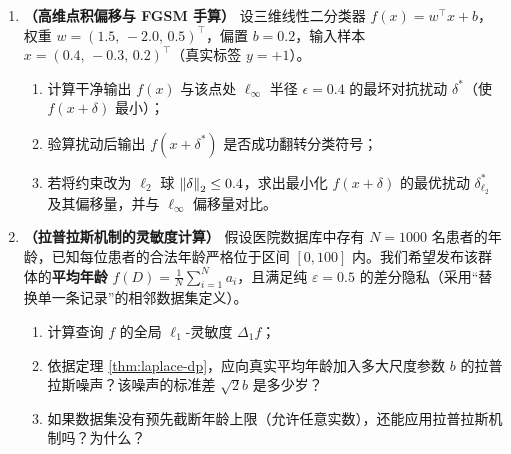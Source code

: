 \begin{enumerate}[label=\textbf{7.3.\arabic*}]
  \item \textbf{（高维点积偏移与 FGSM 手算）} 设三维线性二分类器 $f(x) = w^\top x + b$，权重 $w = (1.5,\, -2.0,\, 0.5)^\top$，偏置 $b = 0.2$，输入样本 $x = (0.4,\, -0.3,\, 0.2)^\top$（真实标签 $y = +1$）。
  \begin{enumerate}
    \item 计算干净输出 $f(x)$ 与该点处 $\ell_\infty$ 半径 $\epsilon = 0.4$ 的最坏对抗扰动 $\delta^*$（使 $f(x+\delta)$ 最小）；
    \item 验算扰动后输出 $f(x+\delta^*)$ 是否成功翻转分类符号；
    \item 若将约束改为 $\ell_2$ 球 $\left\|\delta\right\|_2 \le 0.4$，求出最小化 $f(x+\delta)$ 的最优扰动 $\delta_{\ell_2}^*$ 及其偏移量，并与 $\ell_\infty$ 偏移量对比。
  \end{enumerate}

  \item \textbf{（拉普拉斯机制的灵敏度计算）} 假设医院数据库中存有 $N = 1000$ 名患者的年龄，已知每位患者的合法年龄严格位于区间 $[0, 100]$ 内。我们希望发布该群体的\textbf{平均年龄} $f(D) = \frac{1}{N}\sum_{i=1}^N a_i$，且满足纯 $\varepsilon = 0.5$ 的差分隐私（采用“替换单一条记录”的相邻数据集定义）。
  \begin{enumerate}
    \item 计算查询 $f$ 的全局 $\ell_1$-灵敏度 $\Delta_1 f$；
    \item 依据定理 \ref{thm:laplace-dp}，应向真实平均年龄加入多大尺度参数 $b$ 的拉普拉斯噪声？该噪声的标准差 $\sqrt{2}b$ 是多少岁？
    \item 如果数据集没有预先截断年龄上限（允许任意实数），还能应用拉普拉斯机制吗？为什么？
  \end{enumerate}
\end{enumerate}


